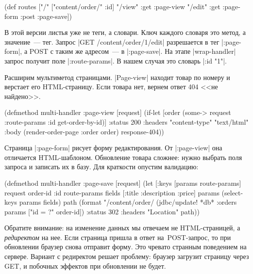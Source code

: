 \begin{english}
  \begin{clojure}
(def routes
  ["/" {["content/order/" :id]
        {"/view" {:get  :page-view}
         "/edit" {:get  :page-form
                  :post :page-save}}}])
  \end{clojure}
\end{english}

В этой версии листья уже не теги, а словари. Ключ каждого словаря это метод, а
значение~--- тег. Запрос \spverb|GET /content/order/1/edit| разрешается в тег
\spverb|:page-form|, а POST с таким же адресом~--- в \spverb|:page-save|.  На
этапе \spverb|wrap-handler| запрос получит поле \spverb|:route-params|.  В нашем
случая это словарь \spverb|{:id "1"}|.

Расширим мультиметод страницами. \spverb|Page-view| находит товар по номеру и
верстает его HTML-страницу. Если товара нет, вернем ответ 404 <<не найдено>>.

\begin{english}
  \begin{clojure}
(defmethod multi-handler :page-view
  [request]
  (if-let [order (some-> request :route-params
                         :id get-order-by-id)]
    {:status 200
     :headers {"content-type" "text/html"}
     :body (render-order-page {:order order})}
    response-404))
  \end{clojure}
\end{english}

Страница \spverb|:page-form| рисует форму редактирования. От \spverb|:page-view|
она отличается HTML-шаблоном. Обновление товара сложнее: нужно выбрать поля
запроса и записать их в базу. Для краткости опустим валидацию:

\begin{english}
  \begin{clojure}
(defmethod multi-handler :page-save
  [request]
  (let [{:keys [params route-params]} request
        {order-id :id} route-params
        fields [:title :description :price]
        params (select-keys params fields)
        path (format "/content/order/%
    (jdbc/update! *db* :orders params ["id = ?" order-id])
    {:status 302
     :headers {"Location" path}}))
  \end{clojure}
\end{english}

Обратите внимание: на изменение данных мы отвечаем не HTML-страницей, а
\emph{редиректом} на нее. Если страница пришла в ответ на~POST-запрос, то при
обновлении браузер снова отправит форму. Это чревато странным поведением на
сервере. Вариант с редиректом решает проблему: браузер загрузит страницу через
GET, и побочных эффектов при обновлении не будет.

